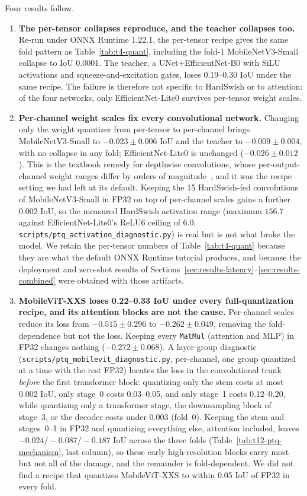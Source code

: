 

Four results follow.

\begin{enumerate}
\item \textbf{The per-tensor collapses reproduce, and the teacher collapses too.} Re-run under ONNX Runtime 1.22.1, the per-tensor recipe gives the same fold pattern as Table~\ref{tab:t4-quant}, including the fold-1 MobileNetV3-Small collapse to IoU 0.0001. The teacher, a UNet$+$EfficientNet-B0 with SiLU activations and squeeze-and-excitation gates, loses 0.19--0.30 IoU under the same recipe. The failure is therefore not specific to HardSwish or to attention: of the four networks, only EfficientNet-Lite0 survives per-tensor weight scales.
\item \textbf{Per-channel weight scales fix every convolutional network.} Changing only the weight quantizer from per-tensor to per-channel brings MobileNetV3-Small to $-0.023 \pm 0.006$ IoU and the teacher to $-0.009 \pm 0.004$, with no collapse in any fold; EfficientNet-Lite0 is unchanged ($-0.026 \pm 0.012$). This is the textbook remedy for depthwise convolutions, whose per-output-channel weight ranges differ by orders of magnitude~\cite{krishnamoorthi2018quantizing}, and it was the recipe setting we had left at its default. Keeping the 15 HardSwish-fed convolutions of MobileNetV3-Small in FP32 on top of per-channel scales gains a further 0.002 IoU, so the measured HardSwish activation range (maximum $156.7$ against EfficientNet-Lite0's ReLU6 ceiling of $6.0$; \texttt{scripts/ptq\_activation\_diagnostic.py}) is real but is not what broke the model. We retain the per-tensor numbers of Table~\ref{tab:t4-quant} because they are what the default ONNX Runtime tutorial produces, and because the deployment and zero-shot results of Sections~\ref{sec:results-latency}--\ref{sec:results-combined} were obtained with those artifacts.
\item \textbf{MobileViT-XXS loses 0.22--0.33 IoU under every full-quantization recipe, and its attention blocks are not the cause.} Per-channel scales reduce its loss from $-0.515 \pm 0.296$ to $-0.262 \pm 0.049$, removing the fold-dependence but not the loss. Keeping every \texttt{MatMul} (attention and MLP) in FP32 changes nothing ($-0.272 \pm 0.068$). A layer-group diagnostic (\texttt{scripts/ptq\_mobilevit\_diagnostic.py}, per-channel, one group quantized at a time with the rest FP32) locates the loss in the convolutional trunk \emph{before} the first transformer block: quantizing only the stem costs at most 0.002 IoU, only stage~0 costs 0.03--0.05, and only stage~1 costs 0.12--0.20, while quantizing only a transformer stage, the downsampling block of stage~3, or the decoder costs under 0.003 (fold~0). Keeping the stem and stages~0--1 in FP32 and quantizing everything else, attention included, leaves $-0.024 / -0.087 / -0.187$ IoU across the three folds (Table~\ref{tab:t12-ptq-mechanism}, last column), so these early high-resolution blocks carry most but not all of the damage, and the remainder is fold-dependent. We did not find a recipe that quantizes MobileViT-XXS to within 0.05 IoU of FP32 in every fold.

\end{enumerate}
